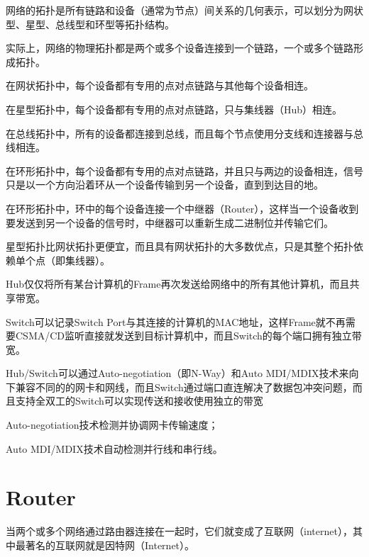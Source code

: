 网络的拓扑是所有链路和设备（通常为节点）间关系的几何表示，可以划分为网状型、星型、总线型和环型等拓扑结构。

实际上，网络的物理拓扑都是两个或多个设备连接到一个链路，一个或多个链路形成拓扑。

\begin{compactitem}
\item 在网状拓扑中，每个设备都有专用的点对点链路与其他每个设备相连。
\item 在星型拓扑中，每个设备都有专用的点对点链路，只与集线器（Hub）相连。
\item 在总线拓扑中，所有的设备都连接到总线，而且每个节点使用分支线和连接器与总线相连。
\item 在环形拓扑中，每个设备都有专用的点对点链路，并且只与两边的设备相连，信号只是以一个方向沿着环从一个设备传输到另一个设备，直到到达目的地。
\end{compactitem}

在环形拓扑中，环中的每个设备连接一个中继器（Router），这样当一个设备收到要发送到另一个设备的信号时，中继器可以重新生成二进制位并传输它们。

星型拓扑比网状拓扑更便宜，而且具有网状拓扑的大多数优点，只是其整个拓扑依赖单个点（即集线器）。

\begin{compactitem}
\item Hub仅仅将所有某台计算机的Frame再次发送给网络中的所有其他计算机，而且共享带宽。
\item Switch可以记录Switch Port与其连接的计算机的MAC地址，这样Frame就不再需要CSMA/CD监听直接就发送到目标计算机中，而且Switch的每个端口拥有独立带宽。
\end{compactitem}

Hub/Switch可以通过Auto-negotiation（即N-Way）和Auto MDI/MDIX技术来向下兼容不同的的网卡和网线，而且Switch通过端口直连解决了数据包冲突问题，而且支持全双工的Switch可以实现传送和接收使用独立的带宽

\begin{compactitem}
\item Auto-negotiation技术检测并协调网卡传输速度；
\item Auto MDI/MDIX技术自动检测并行线和串行线。
\end{compactitem}

\section{Router}



当两个或多个网络通过路由器连接在一起时，它们就变成了互联网（internet），其中最著名的互联网就是因特网（Internet）。

